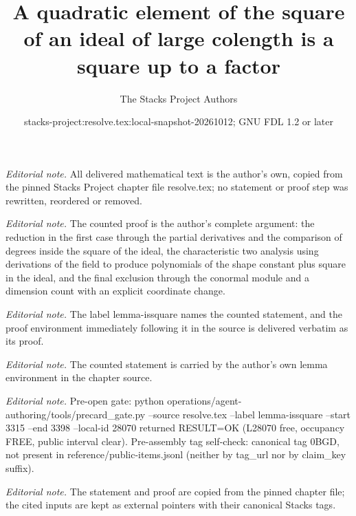\documentclass[10pt,a4paper]{amsart}
\title{A quadratic element of the square of an ideal of large colength is a square up to a factor}
\author{The Stacks Project Authors}
\date{stacks-project:resolve.tex:local-snapshot-20261012; GNU FDL 1.2 or later}
\theoremstyle{plain}
\theoremstyle{definition}
\theoremstyle{remark}
\numberwithin{equation}{subsection}
\begin{document}
\maketitle
\noindent\textit{Editorial note.} All delivered mathematical text is the author's own, copied from the pinned Stacks Project chapter file resolve.tex; no statement or proof step was rewritten, reordered or removed.\par\medskip
\noindent\textit{Editorial note.} The counted proof is the author's complete argument: the reduction in the first case through the partial derivatives and the comparison of degrees inside the square of the ideal, the characteristic two analysis using derivations of the field to produce polynomials of the shape constant plus square in the ideal, and the final exclusion through the conormal module and a dimension count with an explicit coordinate change.\par\medskip
\noindent\textit{Editorial note.} The label lemma-issquare names the counted statement, and the proof environment immediately following it in the source is delivered verbatim as its proof.\par\medskip
\noindent\textit{Editorial note.} The counted statement is carried by the author's own lemma environment in the chapter source.\par\medskip
\noindent\textit{Editorial note.} Pre-open gate: python operations/agent-authoring/tools/precard\_gate.py --source resolve.tex --label lemma-issquare --start 3315 --end 3398 --local-id 28070 returned RESULT=OK (L28070 free, occupancy FREE, public interval clear). Pre-assembly tag self-check: canonical tag 0BGD, not present in reference/public-items.jsonl (neither by tag\_url nor by claim\_key suffix).\par\medskip
\noindent\textit{Editorial note.} The statement and proof are copied from the pinned chapter file; the cited inputs are kept as external pointers with their canonical Stacks tags.\par\medskip
\end{document}
